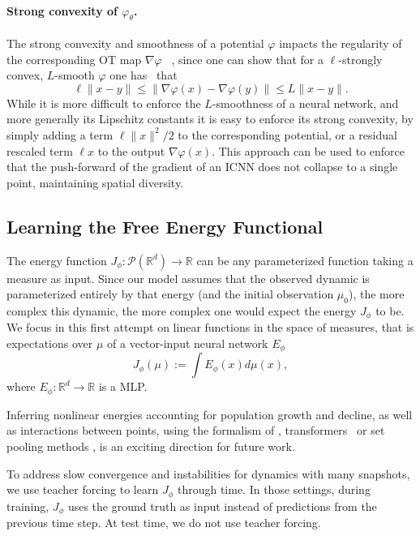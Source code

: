 \paragraph{Strong convexity of $\varphi_\theta$.} The strong convexity and smoothness of a potential $\varphi$ impacts the regularity of the corresponding OT map $\nabla\varphi$ ~\citep{caffarelli2000monotonicity,figalli2010optimal}, since one can show that for a $\ell$-strongly convex, $L$-smooth $\varphi$ one has~\citep{paty2020regularity} that
$$
\ell \|x - y\| \leq \|\nabla\varphi(x) -\nabla\varphi(y)\|  \leq L\|x - y\|.
$$
While it is more difficult to enforce the $L$-smoothness of a neural network, and more generally its Lipschitz constants \citep{scaman2018lipschitz} it is easy to enforce its strong convexity, by simply adding a term $\ell \|x\|^2/2$ to the corresponding potential, or a residual rescaled term $\ell x$ to the output $\nabla\varphi(x)$. This approach can be used to enforce that the push-forward of the gradient of an ICNN does not collapse to a single point, maintaining spatial diversity.

\subsection{Learning the Free Energy Functional}  \label{sec:learn_energy}
The energy function $J_\phi : \mathcal{P}(\mathbb{R}^d) \rightarrow \mathbb{R}$ can be any parameterized function taking a measure as input. 
Since our model assumes that the observed dynamic is parameterized entirely by that energy (and the initial observation $\mu_0$), the more complex this dynamic, the more complex one would expect the energy $J_\phi$ to be. We focus in this first attempt on linear functions in the space of measures, that is expectations over $\mu$ of a vector-input neural network $E_\phi$
\begin{equation} \label{eq:energy}
    J_\phi(\mu) := \int E_\phi(x) d\mu(x),
\end{equation}
where $E_\phi:\mathbb{R}^d \rightarrow \mathbb{R}$ is a \acrfull{MLP}.


Inferring nonlinear energies accounting for population growth and decline, as well as interactions between points, using the formalism of \citep{de2019stochastic}, transformers~\citep{vaswani2017attention} or set pooling methods \citep{edwards2016towards, zaheer2017deep}, is an exciting direction for future work.

To address slow convergence and instabilities for dynamics with many snapshots, we use teacher forcing \citep{williams1989learning} to learn $J_\phi$ through time. In those settings, during training, $J_\phi$ uses the ground truth as input instead of predictions from the previous time step. At test time, we do not use teacher forcing.

